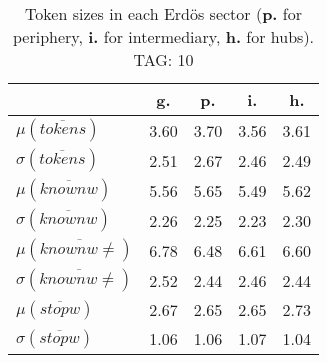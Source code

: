 \begin{table}[h!]
\begin{center}
\begin{tabular}{| l | c | c | c | c |}\hline
 & g. & p. & i. & h. \\\hline
$\mu(\overline{tokens})$ & 3.60  & 3.70  & 3.56  & 3.61 \\\hline
$\sigma(\overline{tokens})$ & 2.51  & 2.67  & 2.46  & 2.49 \\\hline
$\mu(\overline{knownw})$ & 5.56  & 5.65  & 5.49  & 5.62 \\\hline
$\sigma(\overline{knownw})$ & 2.26  & 2.25  & 2.23  & 2.30 \\\hline
$\mu(\overline{knownw \neq})$ & 6.78  & 6.48  & 6.61  & 6.60 \\\hline
$\sigma(\overline{knownw \neq})$ & 2.52  & 2.44  & 2.46  & 2.44 \\\hline
$\mu(\overline{stopw})$ & 2.67  & 2.65  & 2.65  & 2.73 \\\hline
$\sigma(\overline{stopw})$ & 1.06  & 1.06  & 1.07  & 1.04 \\\hline
\end{tabular}
\caption{Token sizes in each Erd\"os sector ({{\bf p.}} for periphery, {{\bf i.}} for intermediary, {{\bf h.}} for hubs). TAG: 10}
\end{center}
\end{table}